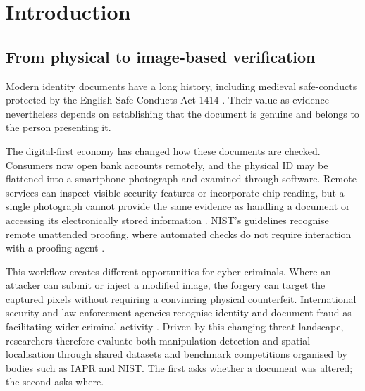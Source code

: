 
\chapter{Introduction}

\label{ch:introduction}

\section{From physical to image-based verification}
\label{sec:intro-document-as-image}

Modern identity documents have a long history, including medieval safe-conducts protected by the English Safe Conducts Act 1414 \citep{McHugh2021,SafeConducts1414}. Their value as evidence nevertheless depends on establishing that the document is genuine and belongs to the person presenting it.

The digital-first economy has changed how these documents are checked. Consumers now open bank accounts remotely, and the physical ID may be flattened into a smartphone photograph and examined through software. Remote services can inspect visible security features or incorporate chip reading, but a single photograph cannot provide the same evidence as handling a document or accessing its electronically stored information \parencite{GovUK2018}. NIST's guidelines recognise remote unattended proofing, where automated checks do not require interaction with a proofing agent \citep{nist2025sp80063a}.

This workflow creates different opportunities for cyber criminals. Where an attacker can submit or inject a modified image, the forgery can target the captured pixels without requiring a convincing physical counterfeit. International security and law-enforcement agencies recognise identity and document fraud as facilitating wider criminal activity \parencite{EuropolSOCTA2025, frontex2025ara}. Driven by this changing threat landscape, researchers therefore evaluate both manipulation detection and spatial localisation \citep{LuoICDAR2023,GuanOpenMFC2022} through shared datasets and benchmark competitions organised by bodies such as IAPR and NIST. The first asks whether a document was altered; the second asks where.

